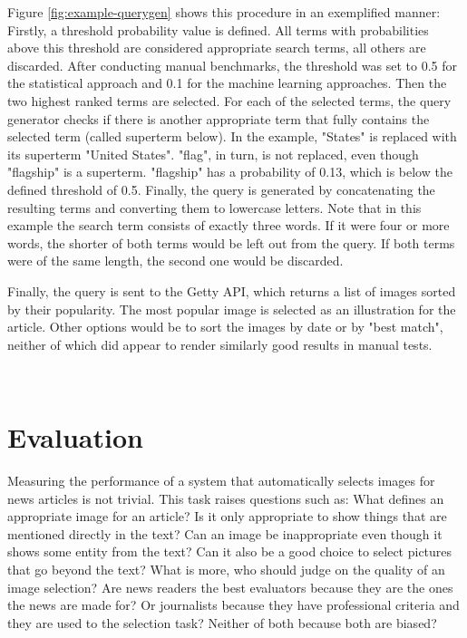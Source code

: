 \documentclass[11pt,a4paper,twoside]{article}
\begin{document}
Figure \ref{fig:example-querygen} shows this procedure in an exemplified manner: Firstly, a threshold probability value is defined. All terms with probabilities above this threshold are considered appropriate search terms, all others are discarded. After conducting manual benchmarks, the threshold was set to 0.5 for the statistical approach and 0.1 for the machine learning approaches. Then the two highest ranked terms are selected. For each of the selected terms, the query generator checks if there is another appropriate term that fully contains the selected term (called superterm below). In the example, "States" is replaced with its superterm "United States". "flag", in turn, is not replaced, even though "flagship" is a superterm. "flagship" has a probability of 0.13, which is below the defined threshold of 0.5. Finally, the query is generated by concatenating the resulting terms and converting them to lowercase letters. Note that in this example the search term consists of exactly three words. If it were four or more words, the shorter of both terms would be left out from the query. If both terms were of the same length, the second one would be discarded.

Finally, the query is sent to the Getty API, which returns a list of images sorted by their popularity. The most popular image is selected as an illustration for the article. Other options would be to sort the images by date or by "best match", neither of which did appear to render similarly good results in manual tests.

\


\cleardoublepage

\section{Evaluation} \label{Eval}

Measuring the performance of a system that automatically selects images for news articles is not trivial. This task raises questions such as: What defines an appropriate image for an article? Is it only appropriate to show things that are mentioned directly in the text? Can an image be inappropriate even though it shows some entity from the text? Can it also be a good choice to select pictures that go beyond the text? What is more, who should judge on the quality of an image selection? Are news readers the best evaluators because they are the ones the news are made for? Or journalists because they have professional criteria and they are used to the selection task? Neither of both because both are biased?
\end{document}
